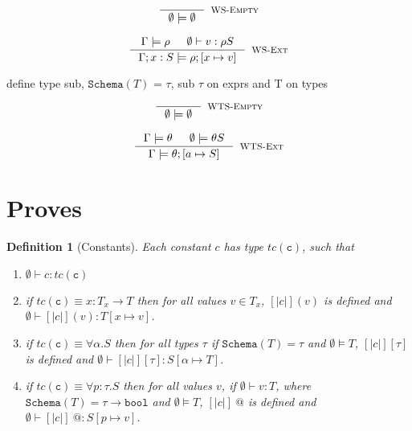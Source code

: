 \documentclass[10pt,a4paper]{article}
\makeatletter
\newcommand\highlight[2]{{\setlength\fboxsep{1pt}\colorbox{#1}{#2}}}
\def\NV{\highlight{colorNV}}
\newtheorem{definition}{Definition}
\newcommand\vref{\ensuremath{v}}
\newcommand\tref[2]{\ensuremath{\left\lbrace \vref : #1\mid #2\right\rbrace}}
\newcommand\tbbool{\ensuremath{\texttt{bool}}}
\newcommand\tc[1]{\ensuremath{tc\left(\texttt{#1}\right)}}
\newcommand\tfun[3]{\ensuremath{#1 : #2 \rightarrow #3}}
\newcommand\tpabs[3]{\ensuremath{\forall #1 : #2 . #3}}
\newcommand\ttabs[2]{\ensuremath{\forall #1 . #2}}
\newcommand\etapp[2]{\ensuremath{{#1} \left[ {#2}\right]}}
\newcommand\epapp[1]{\ensuremath{{#1} \ @}}
\newcommand\wsEmp{\rulename{WS-Empty}}
\newcommand\wsExt{\rulename{WS-Ext}}
\newcommand\wsGxt{\rulename{WS-Gxt}}
\newcommand\wstEmp{\rulename{WTS-Empty}}
\newcommand\wstExt{\rulename{WTS-Ext}}
\newcommand\isWellFormed[2]{\ensuremath{{#1}\models {#2}}}
\newcommand\hastype[3]{\ensuremath{{#1}\vdash {#2}:{#3}}}
\newcommand\hastypeEmp[2]{\hastype{\emptyset}{#1}{#2}}
\newcommand\rulename[1]{\textsc{#1}}
\newcommand\sch[1]{\ensuremath{\texttt{Schema}\left(#1\right)}}
\newcommand\sub[2]{\ensuremath{\left[ #1 \mapsto #2 \right]}}
\makeatother
\begin{document}
$$
\inference{
}{
	\isWellFormed{\emptyset}{\emptyset}
}[\wsEmp]
$$

$$
\inference{
	\isWellFormed{\Gamma}{\rho} && \hastypeEmp{v}{\rho S}
}{
	\isWellFormed{\Gamma; x:S}{\rho ; \sub{x}{v}}
}[\wsExt]
$$



\begin{comment}
$$
\inference{
	\isWellFormed{\Gamma}{\rho} && \evalstar{\rho e}{true}
}{
	\isWellFormed{\Gamma; e}{\rho}
}[\wsGxt]
$$
\end{comment}



\NV{define type sub, \sch{T} = $\tau$, sub $\tau$ on exprs and T on types}\\
\hfill\fbox{\isWellFormed{\Gamma}{\theta}}

$$
\inference{
}{
	\isWellFormed{\emptyset}{\emptyset}
}[\wstEmp]
$$

$$
\inference{
	\isWellFormed{\Gamma}{\theta} && \isWellFormed{\emptyset}{\theta S}
}{
	\isWellFormed{\Gamma}{\theta;\sub{a}{S}}
}[\wstExt]
$$


\section*{Proves}

\begin{definition}[Constants]
\label{DefConstants}
Each constant $c$ has type \tc{c}, such that
\begin{enumerate}
\item \hastypeEmp{c}{\tc{c}}
\item if $\tc{c} \equiv \tfun{x}{T_x}{T}$
	  then for all values $v \in T_x$, 
	  $[|c|](v)$ is defined and 
	  \hastypeEmp{[|c|](v)}{T\sub{x}{v}}.
\item if $\tc{c} \equiv \ttabs{\alpha}{S}$
	  then for all types $\tau$ 
	  if $\sch{T} = \tau$ and \isWellFormed{\emptyset}{T}, 
	  $\etapp{[|c|]}{\tau}$ is defined and 
	  \hastypeEmp{\etapp{[|c|]}{\tau}}{S\sub{\alpha}{T}}.
\item if $\tc{c} \equiv \tpabs{p}{\tau}{S}$
	  then for all values $v$, 
	  if \hastypeEmp{v}{T}, where $\sch{T} = \tau \rightarrow \tbbool$ 
	  and \isWellFormed{\emptyset}{T}, 
	  $\epapp{[|c|]}$ is defined and 
	  \hastypeEmp{\epapp{[|c|]}}{S\sub{p}{v}}.
\end{enumerate}
\end{definition}
\end{document}
